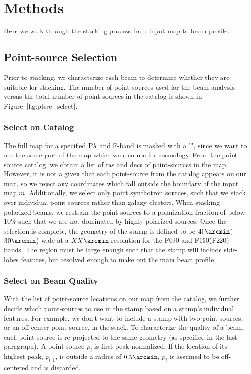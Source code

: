 \section{Methods}
\label{sec:stack}
Here we walk through the stacking process from input map to beam profile.  

\subsection{Point-source Selection}
\label{subsec:ptsrc_sel}
Prior to stacking, we characterize each beam to determine whether they are suitable for stacking.  The number of point sources used for the beam analysis versus the total number of point sources in the catalog is shown in Figure~\ref{fig:ptsrc_select}.

\subsubsection{Select on Catalog}
\label{subsubsec:cat_sel}
The full map for a specified PA and F-band is masked with a "", since we want to use the same part of the map which we also use for cosmology.  From the point-source catalog, we obtain a list of ras and decs of point-sources in the map.  However, it is not a given that each point-source from the catalog appears on our map, so we reject any coordinates which fall outside the boundary of the input map $m$. 
Additionally, we select only point synchotron sources, such that we stack over individual point sources rather than galaxy clusters.  When stacking polarized beams, we restrain the point sources to a polarization fraction of below 10\% such that we are not dominated by highly polarized sources. Once the selection is complete, the geometry of the stamp is defined to be $40\arcmin$($30\arcmin$) wide at a $XX\arcmin$ resolution for the F090 and F150(F220) bands.  The region must be large enough such that the stamp will include side-lobes features, but resolved enough to make out the main beam profile.

\subsubsection{Select on Beam Quality}
\label{subsubsec:beamqual_sel}
With the list of point-source locations on our map from the catalog, we further decide which point-sources to use in the stamp based on a stamp's individual features.  For example, we don't want to include a stamp with two point-sources, or an off-center point-source, in the stack.  To characterize the quality of a beam, each point-source is re-projected to the same geometry (as specified in the last paragraph).  A point source $p_i$ is first peak-normalized.  If the location of its highest peak, $p_{i,1}$, is outside a radius of $0.5\arcmin$, $p_i$ is assumed to be off-centered and is discarded.  

